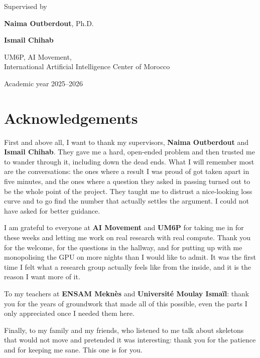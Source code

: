 \documentclass[11pt,a4paper]{report}
\begin{document}
\begin{titlepage}
{\large Supervised by\par}
\vspace{0.4cm}
{\large \textbf{Naima Outberdout}, Ph.D.\par}
\vspace{0.15cm}
{\large \textbf{Ismail Chihab}\par}
\vspace{0.4cm}
{\normalsize UM6P, AI Movement,\\
International Artificial Intelligence Center of Morocco\par}

\vfill
{\large Academic year 2025--2026\par}

\end{titlepage}


\chapter*{Acknowledgements}

First and above all, I want to thank my supervisors, \textbf{Naima
Outberdout} and \textbf{Ismail Chihab}. They gave me a hard, open-ended
problem and then trusted me to wander through it, including down the dead
ends. What I will remember most are the conversations: the ones where a
result I was proud of got taken apart in five minutes, and the ones where a
question they asked in passing turned out to be the whole point of the
project. They taught me to distrust a nice-looking loss curve and to go
find the number that actually settles the argument. I could not have asked
for better guidance.

I am grateful to everyone at \textbf{AI Movement} and \textbf{UM6P} for
taking me in for these weeks and letting me work on real research with real
compute. Thank you for the welcome, for the questions in the hallway, and
for putting up with me monopolising the GPU on more nights than I would
like to admit. It was the first time I felt what a research group actually
feels like from the inside, and it is the reason I want more of it.

To my teachers at \textbf{ENSAM Meknès} and \textbf{Université Moulay
Ismaïl}: thank you for the years of groundwork that made all of this
possible, even the parts I only appreciated once I needed them here.

Finally, to my family and my friends, who listened to me talk about
skeletons that would not move and pretended it was interesting: thank you
for the patience and for keeping me sane. This one is for you.
\end{document}
